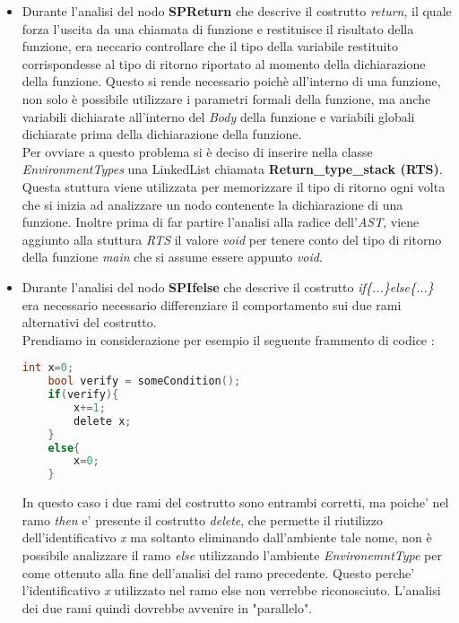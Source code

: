 \documentclass{article}
\begin{document}
\begin{itemize}
    \item Durante l'analisi del nodo \textbf{SPReturn} che descrive il costrutto \textit{return}, il quale forza l'uscita da una chiamata di funzione e restituisce il risultato della funzione, era neccario controllare che il tipo della variabile restituito corrispondesse al tipo di ritorno riportato al momento della dichiarazione della funzione. Questo si rende necessario poichè all'interno di una funzione, non solo è possibile utilizzare i parametri formali della funzione, ma anche variabili dichiarate all'interno del \textit{Body} della funzione e variabili globali dichiarate prima della dichiarazione della funzione. \\
    Per ovviare a questo problema si è deciso di inserire nella classe \textit{EnvironmentTypes} una LinkedList chiamata \textbf{Return\_type\_stack (RTS)}. Questa stuttura viene utilizzata per memorizzare il tipo di ritorno ogni volta che si inizia ad analizzare un nodo contenente la dichiarazione di una funzione. Inoltre prima di far partire l'analisi alla radice dell'\textit{AST}, viene aggiunto alla stuttura \textit{RTS} il valore \textit{void} per tenere conto del tipo di ritorno della funzione \textit{main} che si assume essere appunto \textit{void}.
    \item Durante l'analisi del nodo \textbf{SPIfelse} che descrive il costrutto \textit{if\{...\}else\{...\}} era necessario necessario differenziare il comportamento sui due rami alternativi del costrutto. \\
    Prendiamo in considerazione per esempio il seguente frammento di codice : \\
    \begin{lstlisting}[language=c]
    int x=0;
    bool verify = someCondition();
    if(verify){
        x+=1;
        delete x;
    }
    else{
        x=0;
    }
    \end{lstlisting}
    In questo caso i due rami del costrutto sono entrambi corretti, ma poiche' nel ramo \textit{then} e' presente il costrutto \textit{delete}, che permette il riutilizzo dell'identificativo \textit{x} ma soltanto eliminando dall'ambiente tale nome, non è possibile analizzare il ramo \textit{else} utilizzando l'ambiente \textit{EnvironemntType} per come ottenuto alla fine dell'analisi del ramo precedente. Questo perche' l'identificativo \textit{x} utilizzato nel ramo else non verrebbe riconosciuto. L'analisi dei due rami quindi dovrebbe avvenire in "parallelo". \\

\end{itemize}
\end{document}
